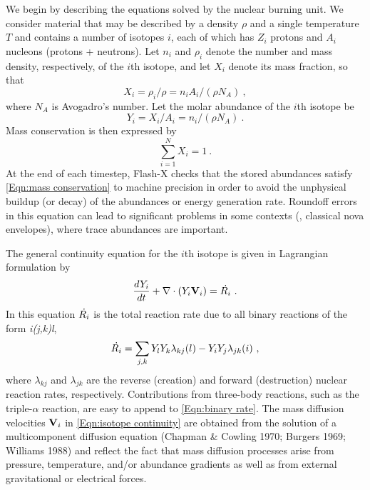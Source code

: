 We begin by describing the equations solved by the nuclear burning
unit. We consider material that may be described by a density
$\rho$ and a single temperature $T$ and contains a number of isotopes
$i$, each of which has $Z_{i}$ protons and $A_i$ nucleons (protons +
neutrons). Let $n_i$ and $\rho_i$ denote the number and mass density,
respectively, of the $i$th isotope, and let $X_i$ denote its mass
fraction, so that
\begin{equation}
X_i = \rho_i/\rho = n_i A_i/(\rho N_A)\ ,
\end{equation}
where $N_A$ is Avogadro's number.
Let the molar abundance of
the $i$th isotope be
\begin{equation}
Y_i = X_i/A_i = n_i/(\rho N_A)\ .
\end{equation}
Mass conservation is then expressed by
\begin{equation}
\label{Eqn:mass conservation}
\sum_{i=1}^N X_i = 1~.
\end{equation}
At the end of each timestep, Flash-X checks that the stored abundances
satisfy \eqref{Eqn:mass conservation} to machine precision in order
to avoid the unphysical buildup (or decay) of the abundances or
energy generation rate. Roundoff errors in this equation can lead to
significant problems in some contexts (\eg, classical nova
envelopes), where trace abundances are important.

The general continuity equation for the $i$th isotope is given in
Lagrangian formulation by
\begin{equation}
\label{Eqn:isotope continuity}
{dY_i\over dt} + \nabla \cdot \left ( Y_i \textbf{V}_i \right ) = \dot{R_i}\ .
\end{equation}
In this equation
$\dot{R_i}$ is the total reaction rate due to
all binary reactions of the form {\it i(j,k)l},
\begin{equation}
\label{Eqn:binary rate}
\dot{R_{i}}
 = \sum_{j,k}
              Y_{l} Y_{k} \lambda _{kj}(l)  - Y_{i} Y_{j} \lambda _{jk}(i)\ ,
\end{equation}
where $\lambda _{kj}$ and $\lambda _{jk}$ are the reverse (creation)
and forward (destruction) nuclear reaction rates, respectively.
Contributions from three-body reactions, such as the triple-$\alpha$
reaction, are easy to append to \eqref{Eqn:binary rate}.  The mass
diffusion velocities $\textbf{V}_i$ in \eqref{Eqn:isotope continuity}
are obtained from the solution of a multicomponent diffusion
equation (Chapman \& Cowling 1970; Burgers 1969; Williams 1988) and
reflect the fact that mass diffusion processes arise from pressure,
temperature, and/or abundance gradients as well as from external
gravitational or electrical forces.

